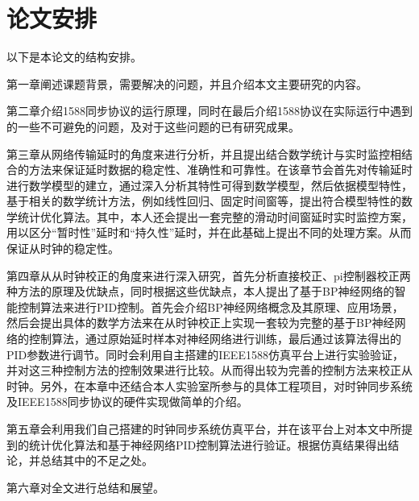 \section{论文安排}
以下是本论文的结构安排。

第一章阐述课题背景，需要解决的问题，并且介绍本文主要研究的内容。

第二章介绍1588同步协议的运行原理，同时在最后介绍1588协议在实际运行中遇到的一些不可避免的问题，及对于这些问题的已有研究成果。

第三章从网络传输延时的角度来进行分析，并且提出结合数学统计与实时监控相结合的方法来保证延时数据的稳定性、准确性和可靠性。在该章节会首先对传输延时进行数学模型的建立，通过深入分析其特性可得到数学模型，然后依据模型特性，基于相关的数学统计方法，例如线性回归、固定时间窗等，提出符合模型特性的数学统计优化算法。其中，本人还会提出一套完整的滑动时间窗延时实时监控方案，用以区分“暂时性”延时和“持久性”延时，并在此基础上提出不同的处理方案。从而保证从时钟的稳定性。

第四章从从时钟校正的角度来进行深入研究，首先分析直接校正、pi控制器校正两种方法的原理及优缺点，同时根据这些优缺点，本人提出了基于BP神经网络的智能控制算法来进行PID控制。首先会介绍BP神经网络概念及其原理、应用场景，然后会提出具体的数学方法来在从时钟校正上实现一套较为完整的基于BP神经网络的控制算法，通过原始延时样本对神经网络进行训练，最后通过该算法得出的PID参数进行调节。同时会利用自主搭建的IEEE1588仿真平台上进行实验验证，并对这三种控制方法的控制效果进行比较。从而得出较为完善的控制方法来校正从时钟。另外，在本章中还结合本人实验室所参与的具体工程项目，对时钟同步系统及IEEE1588同步协议的硬件实现做简单的介绍。

第五章会利用我们自己搭建的时钟同步系统仿真平台，并在该平台上对本文中所提到的统计优化算法和基于神经网络PID控制算法进行验证。根据仿真结果得出结论，并总结其中的不足之处。

第六章对全文进行总结和展望。

